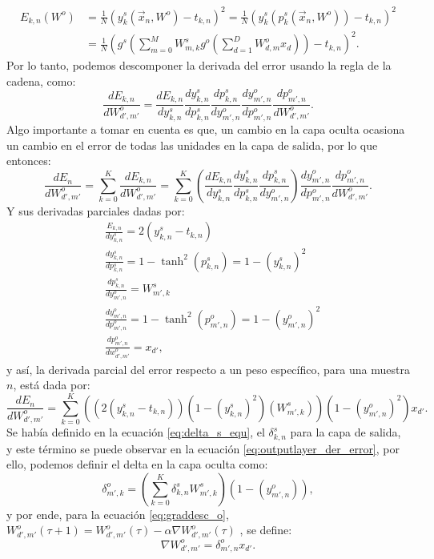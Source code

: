 \documentclass{article}
\begin{document}
\begin{align*}
    E_{k,n}(W^o) &= \frac{1}{N}(y_{k}^s(\vec{x}_n, W^o) - t_{k,n})^2 = \frac{1}{N}(y_{k}^s(p_k^s(\vec{x}_n, W^o)) - t_{k,n})^2 \\
    &= \frac{1}{N}\left( g^s\left( \sum_{m=0}^{M}{W_{m,k}^s g^o \left( \sum_{d=1}^{D}{W_{d,m}^o x_d} \right) } \right) - t_{k,n}\right)^2.
\end{align*}
\noindent
Por lo tanto, podemos descomponer la derivada del error usando la regla de la cadena, como:
\begin{equation}
    \frac{dE_{k,n}}{dW_{d',m'}^o} = \frac{dE_{k,n}}{dy_{k,n}^s} \frac{dy_{k,n}^s}{dp_{k,n}^s}  \frac{dp_{k,n}^s}{dy_{m',n}^o} \frac{dy_{m',n}^o}{dp_{m',n}^o} \frac{dp_{m',n}^o}{dW_{d',m'}^o}. \label{eq:par_deriv_o}
\end{equation}
\noindent
Algo importante a tomar en cuenta es que, un cambio en la capa oculta ocasiona un cambio en el error de todas las unidades en la capa de salida, por lo que entonces:
\begin{equation*}
     \frac{dE_{n}}{dW_{d',m'}^o} = \sum_{k=0}^{K}{\frac{dE_{k,n}}{dW_{d',m'}^o}} = \sum_{k=0}^{K}{ \left( \frac{dE_{k,n}}{dy_{k,n}^s} \frac{dy_{k,n}^s}{dp_{k,n}^s}  \frac{dp_{k,n}^s}{dy_{m',n}^o} \right) }  \frac{dy_{m',n}^o}{dp_{m',n}^o} \frac{dp_{m',n}^o}{dW_{d',m'}^o}.
\end{equation*}
\noindent
Y sus derivadas parciales dadas por:
\begin{align}
    &\frac{E_{k,n}}{dy_{k,n}^s} = 2(y_{k,n}^s - t_{k,n}) \\
    &\frac{dy_{k,n}^s}{dp_{k,n}^s} = 1 - \tanh^2(p_{k,n}^s) =  1 - (y_{k,n}^s)^2 \\
    &\frac{dp_{k,n}^s}{dy_{m',n}^o} = W_{m',k}^s \\
    &\frac{dy_{m',n}^o}{dp_{m',n}^o} = 1 - \tanh^2(p_{m',n}^o) = 1 - (y_{m',n}^o)^2 \\
    &\frac{dp_{m',n}^o}{dw_{d',m'}^o} = x_{d'},
\end{align}
\noindent
y así, la derivada parcial del error respecto a un peso específico, para una muestra $n$, está dada por:
\begin{equation}
    \frac{dE_n}{dW_{d',m'}^o} = \sum_{k=0}^{K}{ \left( (2(y_{k,n}^s - t_{k,n})) (1 - (y_{k,n}^s)^2) (W_{m',k}^s) \right) } (1 - (y_{m',n}^o)^2) x_{d'}. \label{eq:outputlayer_der_error}
\end{equation}
\noindent
Se había definido en la ecuación \ref{eq:delta_s_equ}, el $\delta_{k,n}^s$ para la capa de salida, y este término se puede observar en la ecuación \ref{eq:outputlayer_der_error}, por ello, podemos definir el delta en la capa oculta como:
\begin{equation}
    \delta_{m',k}^o = \left( \sum_{k=0}^{K} \delta_{k,n}^sW_{m',k}^s\right) (1- (y_{m',n}^o)), \label{eq:delta_o_equ}
\end{equation}
\noindent
y por ende, para la ecuación \ref{eq:graddesc_o}, $ W_{d',m'}^o(\tau + 1) = W_{d',m'}^o(\tau) - \alpha \nabla W_{d',m'}^o(\tau)$ , se define:
\begin{equation*}
    \nabla W_{d',m'}^o = \delta_{m',n}^{o}x_{d'}.
\end{equation*}
\end{document}
